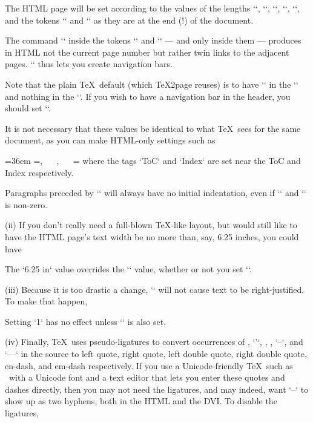 %
The HTML page will be set according to the values of the
lengths `\hsize`, `\hoffset`, `\voffset`,
`\parskip`, `\parindent`, and the tokens `\headline`
and `\footline` as they are at the end (!) of
the document.

The command `\folio` inside the tokens `\headline` and `\footline`
— and only inside them —
produces in HTML not the current page number but rather twin links to the
adjacent pages. `\folio` thus lets you create navigation
bars.

Note that the plain \TeX\ default (which
\TeX2page reuses) is to have `\folio` in the
`\footline` and nothing in the `\headline`.  If you wish
to have a navigation bar in the header, you should set
`\headline`.

It is not necessary that these values be
identical to what \TeX\ sees for the same document, as you can
make HTML-only settings such as

%
\begintt
\ifx\shipout\UnDeFiNeD
  \hsize=36em
  \headline={\folio, ~~ , ~~ }
  \footline={\the\headline}  %
\fi
\endtt
%
 where the tags `ToC` and `Index` are set near
the ToC and Index respectively.

%
Paragraphs preceded by `\noindent` will always have no initial
indentation, even if `` and `\parskip` is
non-zero.

%
(ii) If you don’t really need a full-blown \TeX-like layout, but would
still like to have the HTML page’s text width be no more than,
say, 6.25 inches, you could have

\begintt
\def\TZPhsize{6.25 in}
\endtt
%
The `\TZPhsize` value overrides the `\hsize` value, whether
or not you set `\TZPtexlayout`.

(iii) Because it is too drastic a change, `` will not cause
text to be right-justified.  To make that happen,

\begintt
\let\TZPrightjustify=1
\endtt
%
Setting `\TZPrightjustify` has no effect unless `\TZPtexlayout` is
also set.

(iv) Finally, \TeX\ uses pseudo-ligatures to convert
occurrences of , `'`, , , `--`, and `---`
in the source to left quote, right quote, left double quote,
right double quote, en-dash, and em-dash respectively.
If you use a Unicode-friendly \TeX\ such as \XeTeX\ with a Unicode font
and a text editor that lets you enter these quotes and dashes directly,
then you may not need the ligatures, and may indeed, want `--` to
show up as two hyphens, both in the HTML and the DVI.  To
disable the ligatures,

